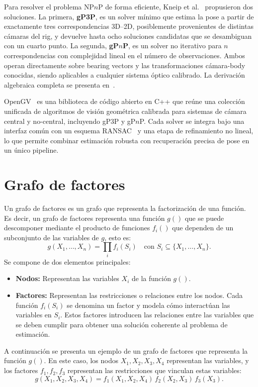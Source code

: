 Para resolver el problema NP$n$P de forma eficiente, Kneip et al.~\cite{kneip2013gpnp} propusieron dos soluciones. La primera, \textbf{gP3P}, es un solver mínimo que estima la pose a partir de exactamente tres correspondencias 3D--2D, posiblemente provenientes de distintas cámaras del rig, y devuelve hasta ocho soluciones candidatas que se desambiguan con un cuarto punto. La segunda, \textbf{gP$n$P}, es un solver no iterativo para $n$ correspondencias con complejidad lineal en el número de observaciones. Ambos operan directamente sobre bearing vectors y las transformaciones cámara-body conocidas, siendo aplicables a cualquier sistema óptico calibrado. La derivación algebraica completa se presenta en~\cite{kneip2013gpnp}.

OpenGV~\cite{kneip2014opengv} es una biblioteca de código abierto en C++ que reúne una colección unificada de algoritmos de visión geométrica calibrada para sistemas de cámara central y no-central, incluyendo gP3P y gP$n$P. Cada solver se integra bajo una interfaz común con un esquema RANSAC~\cite{fischler1987ransac} y una etapa de refinamiento no lineal, lo que permite combinar estimación robusta con recuperación precisa de pose en un único pipeline.

\section{Grafo de factores}

Un grafo de factores es un grafo que representa la factorización de una función. Es decir, un
grafo de factores representa una función $g()$ que se puede descomponer mediante el producto de
funciones $f_i()$ que dependen de un subconjunto de las variables de $g$, esto es:
\[
g(X_1, \ldots, X_n) = \prod_{i} f_i(S_i) \quad \text{con } S_i \subseteq \{X_1, \ldots, X_n\}.
\]
Se compone de dos elementos principales:
\begin{itemize}
    \item \textbf{Nodos:} Representan las variables $X_i$ de la función $g()$.
    \item \textbf{Factores:} Representan las restricciones o relaciones entre los nodos. Cada función $f_i(S_i)$
    se denomina un factor y modela cómo interactúan las variables en $S_i$. Estos factores
    introducen las relaciones entre las variables que se deben cumplir para obtener una solución
    coherente al problema de estimación.
\end{itemize}

A continuación se presenta un ejemplo de un grafo de factores que representa la función
$g()$. En este caso, los nodos $X_1, X_2, X_3, X_4$ representan las variables, y los factores
$f_1, f_2, f_3$ representan las restricciones que vinculan estas variables:
\[
g(X_1, X_2, X_3, X_4) = f_1(X_1, X_2, X_4)\,f_2(X_2, X_3)\,f_3(X_3).
\]

